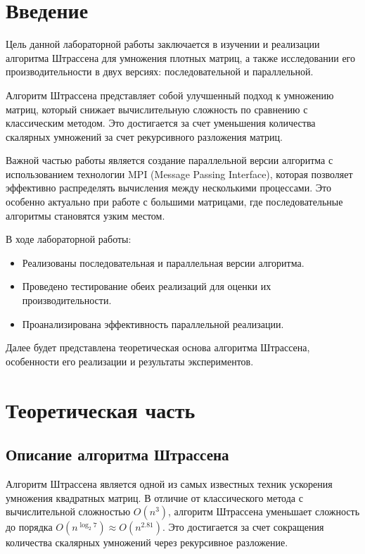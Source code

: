 \documentclass[a4paper, 14pt]{extarticle}
\begin{document}
    \tableofcontents

    \newpage
    \section{Введение}
Цель данной лабораторной работы заключается в изучении и реализации алгоритма Штрассена для умножения плотных матриц, а также исследовании его производительности в двух версиях: последовательной и параллельной. 

Алгоритм Штрассена представляет собой улучшенный подход к умножению матриц, который снижает вычислительную сложность по сравнению с классическим методом. Это достигается за счет уменьшения количества скалярных умножений за счет рекурсивного разложения матриц. 

Важной частью работы является создание параллельной версии алгоритма с использованием технологии MPI (Message Passing Interface), которая позволяет эффективно распределять вычисления между несколькими процессами. Это особенно актуально при работе с большими матрицами, где последовательные алгоритмы становятся узким местом.

В ходе лабораторной работы:
\begin{itemize}
    \item Реализованы последовательная и параллельная версии алгоритма.
    \item Проведено тестирование обеих реализаций для оценки их производительности.
    \item Проанализирована эффективность параллельной реализации.
\end{itemize}

Далее будет представлена теоретическая основа алгоритма Штрассена, особенности его реализации и результаты экспериментов.

    \newpage
    \section{Теоретическая часть}
\subsection{Описание алгоритма Штрассена}

Алгоритм Штрассена является одной из самых известных техник ускорения умножения квадратных матриц. В отличие от классического метода с вычислительной сложностью \(O(n^3)\), алгоритм Штрассена уменьшает сложность до порядка \(O(n^{\log_2 7}) \approx O(n^{2.81})\). Это достигается за счет сокращения количества скалярных умножений через рекурсивное разложение.
\end{document}
